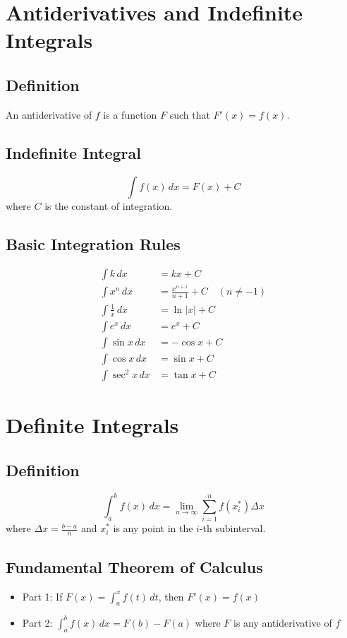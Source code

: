 \documentclass[11pt]{article}
\begin{document}
\section{Antiderivatives and Indefinite Integrals}

\subsection{Definition}
An antiderivative of $f$ is a function $F$ such that $F'(x) = f(x)$.

\subsection{Indefinite Integral}
$$\int f(x) \, dx = F(x) + C$$
where $C$ is the constant of integration.

\subsection{Basic Integration Rules}
\begin{align}
\int k \, dx &= kx + C \\
\int x^n \, dx &= \frac{x^{n+1}}{n+1} + C \quad (n \neq -1) \\
\int \frac{1}{x} \, dx &= \ln|x| + C \\
\int e^x \, dx &= e^x + C \\
\int \sin x \, dx &= -\cos x + C \\
\int \cos x \, dx &= \sin x + C \\
\int \sec^2 x \, dx &= \tan x + C
\end{align}

\section{Definite Integrals}

\subsection{Definition}
$$\int_a^b f(x) \, dx = \lim_{n \to \infty} \sum_{i=1}^n f(x_i^*) \Delta x$$
where $\Delta x = \frac{b-a}{n}$ and $x_i^*$ is any point in the $i$-th subinterval.

\subsection{Fundamental Theorem of Calculus}
\begin{itemize}
    \item Part 1: If $F(x) = \int_a^x f(t) \, dt$, then $F'(x) = f(x)$
    \item Part 2: $\int_a^b f(x) \, dx = F(b) - F(a)$ where $F$ is any antiderivative of $f$
\end{itemize}
\end{document}

